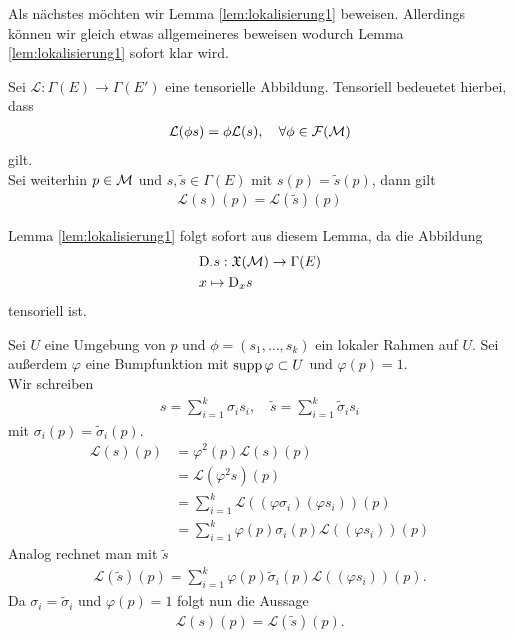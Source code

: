 
Als nächstes möchten wir Lemma \ref{lem:lokalisierung1} beweisen.
Allerdings können wir gleich etwas allgemeineres beweisen wodurch Lemma \ref{lem:lokalisierung1} sofort klar wird.

\begin{lem}
\label{lem:tensorielllokalisierung}
Sei $\mathcal{L}: \Gamma (E) \to \Gamma(E')$ eine tensorielle Abbildung. 
Tensoriell bedeuetet hierbei, dass
\begin{align}
\mathcal{L}(\phi s) = \phi \mathcal{L}(s), \quad \forall \phi \in \mathcal{F}(\mathcal{M})
\end{align}
gilt.\\
Sei weiterhin $p\in \mathcal{M}$ und $s, \tilde{s} \in \Gamma(E)$ mit $s(p) = \tilde{s}(p)$, dann gilt
\begin{align}
\mathcal{L}(s)(p) = \mathcal{L}(\tilde{s})(p)
\end{align} 
\end{lem}
Lemma \ref{lem:lokalisierung1} folgt sofort aus diesem Lemma, da die Abbildung
\begin{align}
&\mathrm{D}_\cdot s : \mathfrak{X}(\mathcal{M}) \to \Gamma (E)\\
& x \mapsto \mathrm{D}_x s
\end{align}
tensoriell ist.

\begin{bew}
Sei $U$ eine Umgebung von $p$ und $\phi = (s_1, \dots, s_k)$ ein lokaler Rahmen auf $U$.
Sei außerdem $\varphi$ eine Bumpfunktion mit $\operatorname{supp} \varphi \subset U$ und $\varphi (p) = 1$.\\
Wir schreiben 
\begin{align}
s = \sum_{i=1}^k \sigma_i s_i , \quad \tilde{s} = \sum_{i=1}^k \tilde{\sigma}_i s_i
\end{align}
mit $\sigma_i (p) = \tilde{\sigma}_i (p)$.
\begin{align}
\mathcal{L}(s)(p) &= \varphi^2 (p) \mathcal{L}(s)(p)\\
&= \mathcal{L}(\varphi^2 s)(p)\\
&= \sum_{i = 1}^k \mathcal{L}((\varphi \sigma_i)(\varphi s_i)) (p)\\
&= \sum_{i = 1}^k \varphi (p) \sigma_i (p) \mathcal{L}((\varphi s_i)) (p) 
\end{align}
Analog rechnet man mit $\tilde{s}$
\begin{align}
\mathcal{L}(\tilde{s})(p) = \sum_{i = 1}^k \varphi (p) \tilde{\sigma}_i (p) \mathcal{L}((\varphi s_i)) (p) .
\end{align}
Da $\sigma_i = \tilde{\sigma}_i$ und $\varphi(p)=1$ folgt nun die Aussage
\begin{align}
\mathcal{L}(s)(p) = \mathcal{L}(\tilde{s})(p).
\end{align}
\end{bew}


